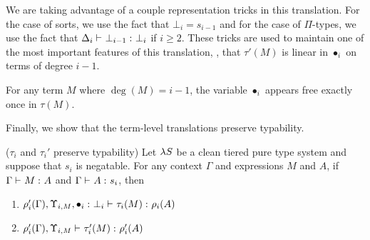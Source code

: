 \documentclass{article}
\begin{document}
We are taking advantage of a couple representation tricks in this translation.
For the case of sorts, we use the fact that $\bot_i = s_{i - 1}$ and for the case of $\Pi$-types, we use the fact that $\Delta_i \vdash_{} {{\bot_{i - 1}} :^{} {\bot_i}}$ if $i \geq 2$.
These tricks are used to maintain one of the most important features of this translation, \ie, that $\tau'(M)$ is linear in $\bullet_i$ on terms of degree $i - 1$.
\begin{lemma}
\label{lem:tau-facts}
For any term $M$ where $\deg(M) = i - 1$, the variable $\bullet_i$ appears free exactly once in $\tau(M)$.
\end{lemma}

Finally, we show that the term-level translations preserve typability.

\begin{lemma}\label{lem:tau-pres}
($\tau_i$ and $\tau_i'$ preserve typability)
Let $\lambda S$ be a clean tiered pure type system and suppose that $s_i$ is negatable.
For any context $\Gamma$ and expressions $M$ and $A$, if $\Gamma \vdash_{} {{M} :^{} {A}}$ and $\Gamma \vdash_{} {{A} :^{} {s_i}}$, then
\begin{enumerate}
    \item\label{item:tau-preserves-types-i}
        $
            \rho_i'(\Gamma), \Upsilon_{i, M},
            {{\bullet_i} :^{} {\bot_i}}
         \vdash_{} {{
            \tau_i(M)
        } :^{} {
            \rho_i(A)
        }}$
    \item\label{item:tau-preserves-types-ii}
        $
            \rho_i'(\Gamma), \Upsilon_{i, M}
         \vdash_{} {{
            \tau_i'(M)
        } :^{} {
            \rho'_i(A)
        }}$
\end{enumerate}
\end{lemma}
\end{document}
